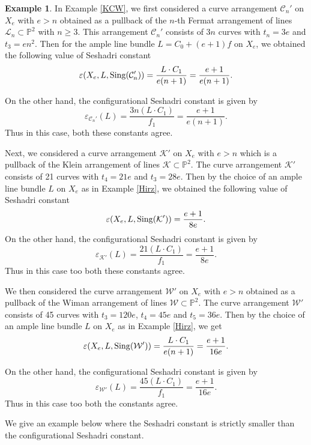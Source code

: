 \documentclass[12pt,reqno]{amsart}
\theoremstyle{plain}
\numberwithin{equation}{section}
\theoremstyle{definition}
\newtheorem{example}[theorem]{Example}
\begin{document}
	\begin{example}
		In Example \ref{KCW}, we first considered a curve arrangement  $\mathcal{C}_n'$ on $X_e$ with $e > n$ obtained as a pullback of the $n$-th Fermat arrangement of lines $\mathcal{L}_n \subset \mathbb{P}^2$  with $n \geq 3.$ This arrangement $\mathcal{C}_n'$ consists of $3n$ curves with $t_n=3e$ and $t_3=en^2.$ Then for the ample line bundle $L=C_0+(e+1)f $ on $X_e$, we obtained the following value of Seshadri constant 
		$$\varepsilon(X_e, L,{\rm Sing}(\mathcal{C}_n')) = \frac{L\cdot C_1}{e(n+1)}=\frac{e+1}{e(n+1)}.$$
		
		On the other hand, the configurational Seshadri constant is given by
		$$	\varepsilon_{\mathcal{C}_n'}(L)= \frac{3n(L\cdot C_1)}{f_1}= \frac{e+1}{e(n+1)}.$$
		Thus in this case, both these constants agree.
		
		Next, we considered a curve arrangement  $\mathcal{K}'$ on $X_e$ with $e > n$ which is a pullback of the Klein arrangement of lines $\mathcal{K} \subset \mathbb{P}^2.$ The curve arrangement  $\mathcal{K}'$ consists of 21 curves with $t_4=21e$ and $t_3=28e.$ Then by the choice of an ample line bundle $L$ on $X_e$ as in Example \ref{Hirz}, we obtained the following value of Seshadri constant 
		$$\varepsilon(X_e, L,{\rm Sing}(\mathcal{K}')) = \frac{e+1}{8e}.$$
		On the other hand, the configurational Seshadri constant is given by
		$$	\varepsilon_{\mathcal{K}'}(L)= \frac{21(L\cdot C_1)}{f_1}= \frac{e+1}{8e}.$$
		Thus in this case too both these constants agree.
		
		We then considered the curve arrangement  $\mathcal{W}'$ on $X_e$ with $e > n$ obtained  as a pullback of the Wiman arrangement of lines $\mathcal{W} \subset \mathbb{P}^2$. The curve arrangement $\mathcal{W}'$ consists of 45 curves with $t_3=120e$, $t_4=45e$ and $t_5=36e.$ Then by the choice of an ample line bundle $L$ on $X_e$ as in Example \ref{Hirz}, we get
		$$\varepsilon(X_e, L,{\rm Sing}(\mathcal{W}')) = \frac{L\cdot C_1}{e(n+1)}=\frac{e+1}{16e}.$$
		
		On the other hand, the configurational Seshadri constant is given by
		$$	\varepsilon_{\mathcal{W}'}(L)= \frac{45(L\cdot C_1)}{f_1}= \frac{e+1}{16e}.$$
		Thus in this case too both the constants agree.
		
	\end{example}
We give an example below where the Seshadri constant is strictly smaller than the configurational Seshadri constant. 
\end{document}
